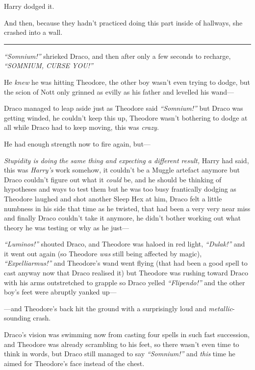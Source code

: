 Harry dodged it.

And then, because they hadn't practiced doing this part inside of
hallways, she crashed into a wall.

\begin{center}\rule{3in}{0.4pt}\end{center}

\emph{``Somnium!''} shrieked Draco, and then after only a few seconds to
recharge, \emph{``SOMNIUM, CURSE YOU!''}

He \emph{knew} he was hitting Theodore, the other boy wasn't even trying
to dodge, but the scion of Nott only grinned as evilly as his father and
levelled his wand---

Draco managed to leap aside just as Theodore said \emph{``Somnium!''}
but Draco was getting winded, he couldn't keep this up, Theodore wasn't
bothering to dodge at all while Draco had to keep moving, this was
\emph{crazy.}

He had enough strength now to fire again, but---

\emph{Stupidity is doing the same thing and expecting a different
result,} Harry had said, this was \emph{Harry's} work somehow, it
couldn't be a Muggle artefact anymore but Draco couldn't figure out what
it \emph{could} be, and he should be thinking of hypotheses and ways to
test them but he was too busy frantically dodging as Theodore laughed
and shot another Sleep Hex at him, Draco felt a little numbness in his
side that time as he twisted, that had been a very very near miss and
finally Draco couldn't take it anymore, he didn't bother working out
what theory he was testing or why as he just---

\emph{``Luminos!''} shouted Draco, and Theodore was haloed in red light,
\emph{``Dulak!''} and it went out again (so Theodore \emph{was} still
being affected by magic), \emph{``Expelliarmus!''} and Theodore's wand
went flying (that had been a good spell to cast anyway now that Draco
realised it) but Theodore was rushing toward Draco with his arms
outstretched to grapple so Draco yelled \emph{``Flipendo!''} and the
other boy's feet were abruptly yanked up---

---and Theodore's back hit the ground with a surprisingly loud and
\emph{metallic}-sounding crash.

Draco's vision was swimming now from casting four spells in such fast
succession, and Theodore was already scrambling to his feet, so there
wasn't even time to think in words, but Draco still managed to say
\emph{``Somnium!''} and \emph{this} time he aimed for Theodore's face
instead of the chest.

